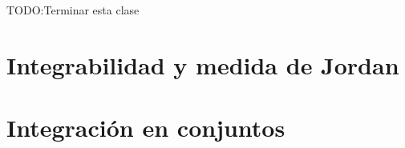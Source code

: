 TODO:\@ Terminar esta clase
\section{Integrabilidad y medida de Jordan}

\section{Integración en conjuntos}
